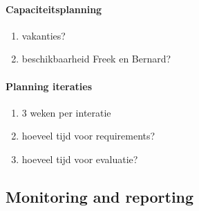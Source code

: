 \paragraph{Capaciteitsplanning}

\begin{enumerate}
 \item vakanties?
 \item beschikbaarheid Freek en Bernard?
\end{enumerate}

\paragraph{Planning iteraties}
\begin{enumerate}
 \item 3 weken per interatie
 \item hoeveel tijd voor requirements?
 \item hoeveel tijd voor evaluatie?
\end{enumerate}






\subsection{Monitoring and reporting}
